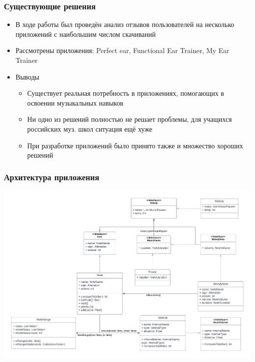 \documentclass{beamer}
\begin{document}
\begin{frame}  
  \frametitle{Существующие решения}
  \begin{itemize}
    \item В ходе работы был проведён анализ отзывов пользователей на несколько приложений с наибольшим числом скачиваний
    \item Рассмотрены приложения: Perfect ear, Functional Ear Trainer, My Ear Trainer 
  \end{itemize}
  
    \begin{itemize}
    \item Выводы
    \begin{itemize}
      \item Существует реальная потребность в приложениях, помогающих в освоении музыкальных навыков
      \item Ни одно из решений полностью не решает проблемы, для учащихся российских муз. школ ситуация ещё хуже
      \item При разработке приложений было принято также и множество хороших решений
    \end{itemize}
  \end{itemize}  
    
\end{frame}
            

\begin{frame}
  \frametitle{Архитектура приложения}
  \includegraphics[width=\textwidth]{../images/UML.pdf}
\end{frame}
\end{document}
